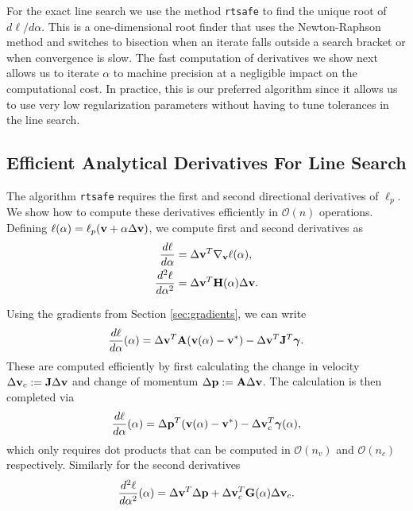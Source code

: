 For the exact line search we use the method \verb;rtsafe; \cite[\S
9.4]{bib:numerical_recipes} to find the unique root of $d\ell/d\alpha$. This is
a one-dimensional root finder that uses the Newton-Raphson method and switches
to bisection when an iterate falls outside a search bracket or when convergence
is slow. The fast computation of derivatives we show next allows us to iterate
$\alpha$ to machine precision at a negligible impact on the computational cost.
In practice, this is our preferred algorithm since it allows us to use very low
regularization parameters without having to tune tolerances in the line search.

\subsection{Efficient Analytical Derivatives For Line Search}

The algorithm \verb;rtsafe; requires the first and second directional
derivatives of $\ell_p$. We show how to compute these
derivatives efficiently in $\mathcal{O}(n)$ operations. Defining $\ell(\alpha) =
\ell_p({\mathbf{v}}+\alpha\Delta{\mathbf{v}})$, we compute first and second derivatives as
\begin{align*}
	\frac{d\ell}{d\alpha}&=\Delta{\mathbf{v}}^T\nabla_{\mathbf{v}}\ell(\alpha),\\
	\frac{d^2\ell}{d\alpha^2}&=\Delta{\mathbf{v}}^T{\mathbf{H}}(\alpha)\Delta{\mathbf{v}}.
\end{align*}

Using the gradients from Section \ref{sec:gradients}, we can write
\begin{align*}
	\frac{d\ell}{d\alpha}(\alpha)=\Delta{\mathbf{v}}^T{\mathbf{A}}({\mathbf{v}}(\alpha)-{\mathbf{v}}^*)-\Delta{\mathbf{v}}^T{\mathbf{J}}^T{\bm\gamma}.
\end{align*}
These are computed efficiently by first calculating the change in velocity
$\Delta{\mathbf{v}}_c:={\mathbf{J}}\Delta{\mathbf{v}}$ and change of momentum $\Delta{\mathbf{p}} :=
{\mathbf{A}}\Delta{\mathbf{v}}$. The calculation is then completed via 
\begin{align*}
	\frac{d\ell}{d\alpha}(\alpha)=\Delta{\mathbf{p}}^T({\mathbf{v}}(\alpha)-{\mathbf{v}}^*)
	-\Delta{\mathbf{v}}_c^T{\bm\gamma}(\alpha),
\end{align*}
which only requires dot products that can be computed in $\mathcal{O}(n_v)$ and
$\mathcal{O}(n_c)$ respectively. Similarly for the second derivatives
\begin{align*}
	\frac{d^2\ell}{d\alpha^2}(\alpha)=\Delta{\mathbf{v}}^T\Delta{\mathbf{p}} + \Delta{\mathbf{v}}_c^T
	{\mathbf{G}}(\alpha)\Delta{\mathbf{v}}_c.
\end{align*}

